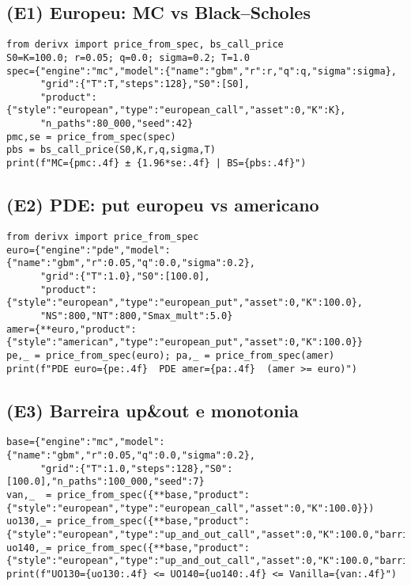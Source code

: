 ﻿\documentclass[11pt,a4paper]{article}
\begin{document}
\subsection{(E1) Europeu: MC vs Black--Scholes}
\begin{lstlisting}[style=pystyle]
from derivx import price_from_spec, bs_call_price
S0=K=100.0; r=0.05; q=0.0; sigma=0.2; T=1.0
spec={"engine":"mc","model":{"name":"gbm","r":r,"q":q,"sigma":sigma},
      "grid":{"T":T,"steps":128},"S0":[S0],
      "product":{"style":"european","type":"european_call","asset":0,"K":K},
      "n_paths":80_000,"seed":42}
pmc,se = price_from_spec(spec)
pbs = bs_call_price(S0,K,r,q,sigma,T)
print(f"MC={pmc:.4f} ± {1.96*se:.4f} | BS={pbs:.4f}")
\end{lstlisting}

\subsection{(E2) PDE: put europeu vs americano}
\begin{lstlisting}[style=pystyle]
from derivx import price_from_spec
euro={"engine":"pde","model":{"name":"gbm","r":0.05,"q":0.0,"sigma":0.2},
      "grid":{"T":1.0},"S0":[100.0],
      "product":{"style":"european","type":"european_put","asset":0,"K":100.0},
      "NS":800,"NT":800,"Smax_mult":5.0}
amer={**euro,"product":{"style":"american","type":"european_put","asset":0,"K":100.0}}
pe,_ = price_from_spec(euro); pa,_ = price_from_spec(amer)
print(f"PDE euro={pe:.4f}  PDE amer={pa:.4f}  (amer >= euro)")
\end{lstlisting}

\subsection{(E3) Barreira up\&out e monotonia}
\begin{lstlisting}[style=pystyle]
base={"engine":"mc","model":{"name":"gbm","r":0.05,"q":0.0,"sigma":0.2},
      "grid":{"T":1.0,"steps":128},"S0":[100.0],"n_paths":100_000,"seed":7}
van,_  = price_from_spec({**base,"product":{"style":"european","type":"european_call","asset":0,"K":100.0}})
uo130,_= price_from_spec({**base,"product":{"style":"european","type":"up_and_out_call","asset":0,"K":100.0,"barrier":130.0}})
uo140,_= price_from_spec({**base,"product":{"style":"european","type":"up_and_out_call","asset":0,"K":100.0,"barrier":140.0}})
print(f"UO130={uo130:.4f} <= UO140={uo140:.4f} <= Vanilla={van:.4f}")
\end{lstlisting}
\end{document}
